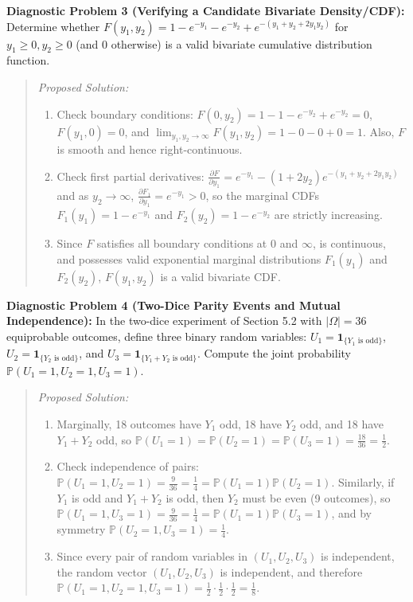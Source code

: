 \documentclass[11pt, letterpaper]{article}
\theoremstyle{definition}
\theoremstyle{remark}
\newcommand{\Prob}{\mathbb{P}}
\begin{document}
\textbf{Diagnostic Problem 3 (Verifying a Candidate Bivariate Density/CDF):}
Determine whether $F(y_1, y_2) = 1 - e^{-y_1} - e^{-y_2} + e^{-(y_1 + y_2 + 2 y_1 y_2)}$ for $y_1 \ge 0, y_2 \ge 0$ (and $0$ otherwise) is a valid bivariate cumulative distribution function.
\begin{quote}
\emph{Proposed Solution:}
\begin{enumerate}[label=\textbf{Step \arabic*:}]
    \item Check boundary conditions: $F(0, y_2) = 1 - 1 - e^{-y_2} + e^{-y_2} = 0$, $F(y_1, 0) = 0$, and $\lim_{y_1, y_2 \to \infty} F(y_1, y_2) = 1 - 0 - 0 + 0 = 1$. Also, $F$ is smooth and hence right-continuous.
    \item Check first partial derivatives: $\frac{\partial F}{\partial y_1} = e^{-y_1} - (1 + 2y_2)e^{-(y_1 + y_2 + 2y_1 y_2)}$ and as $y_2 \to \infty$, $\frac{\partial F_1}{\partial y_1} = e^{-y_1} > 0$, so the marginal CDFs $F_1(y_1) = 1 - e^{-y_1}$ and $F_2(y_2) = 1 - e^{-y_2}$ are strictly increasing.
    \item Since $F$ satisfies all boundary conditions at $0$ and $\infty$, is continuous, and possesses valid exponential marginal distributions $F_1(y_1)$ and $F_2(y_2)$, $F(y_1, y_2)$ is a valid bivariate CDF.
\end{enumerate}
\end{quote}

\textbf{Diagnostic Problem 4 (Two-Dice Parity Events and Mutual Independence):}
In the two-dice experiment of Section 5.2 with $|\Omega| = 36$ equiprobable outcomes, define three binary random variables: $U_1 = \mathbf{1}_{\{Y_1 \text{ is odd}\}}$, $U_2 = \mathbf{1}_{\{Y_2 \text{ is odd}\}}$, and $U_3 = \mathbf{1}_{\{Y_1 + Y_2 \text{ is odd}\}}$. Compute the joint probability $\Prob(U_1 = 1, U_2 = 1, U_3 = 1)$.
\begin{quote}
\emph{Proposed Solution:}
\begin{enumerate}[label=\textbf{Step \arabic*:}]
    \item Marginally, 18 outcomes have $Y_1$ odd, 18 have $Y_2$ odd, and 18 have $Y_1 + Y_2$ odd, so $\Prob(U_1 = 1) = \Prob(U_2 = 1) = \Prob(U_3 = 1) = \frac{18}{36} = \frac{1}{2}$.
    \item Check independence of pairs: $\Prob(U_1 = 1, U_2 = 1) = \frac{9}{36} = \frac{1}{4} = \Prob(U_1 = 1)\Prob(U_2 = 1)$. Similarly, if $Y_1$ is odd and $Y_1 + Y_2$ is odd, then $Y_2$ must be even (9 outcomes), so $\Prob(U_1 = 1, U_3 = 1) = \frac{9}{36} = \frac{1}{4} = \Prob(U_1 = 1)\Prob(U_3 = 1)$, and by symmetry $\Prob(U_2 = 1, U_3 = 1) = \frac{1}{4}$.
    \item Since every pair of random variables in $(U_1, U_2, U_3)$ is independent, the random vector $(U_1, U_2, U_3)$ is independent, and therefore $\Prob(U_1 = 1, U_2 = 1, U_3 = 1) = \frac{1}{2} \cdot \frac{1}{2} \cdot \frac{1}{2} = \frac{1}{8}$.
\end{enumerate}
\end{quote}
\end{document}
